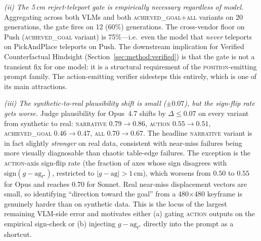 \documentclass{article}
\begin{document}
\emph{(ii) The 5\,cm reject-teleport gate is empirically necessary
regardless of model.} Aggregating across both VLMs and both
\textsc{achieved\_goal}+\textsc{all} variants on 20 generations, the gate
fires on 12 (60\%) generations. The cross-vendor floor on Push
(\textsc{achieved\_goal} variant) is 75\%---i.e.\ even the model that
\emph{never} teleports on PickAndPlace teleports on Push. The downstream
implication for Verified Counterfactual Hindsight
(Section~\ref{sec:method:verified}) is that the gate is not a transient
fix for one model: it is a structural requirement of the
\textsc{position}-emitting prompt family. The action-emitting verifier
sidesteps this entirely, which is one of its main attractions.

\emph{(iii) The synthetic-to-real plausibility shift is small ($\pm 0.07$),
but the sign-flip rate gets worse.} Judge plausibility for Opus~4.7
shifts by $\Delta\!\le\!0.07$ on every variant from synthetic to real:
\textsc{narrative} $0.79\!\to\!0.86$, \textsc{action} $0.55\!\to\!0.51$,
\textsc{achieved\_goal} $0.46\!\to\!0.47$, \textsc{all} $0.70\!\to\!0.67$.
The headline \textsc{narrative} variant is in fact slightly \emph{stronger}
on real data, consistent with near-miss failures being more visually
diagnosable than chaotic table-edge failures. The exception is the
\textsc{action}-axis sign-flip rate (the fraction of axes whose sign disagrees
with $\mathrm{sign}(g\!-\!\mathrm{ag}_{t^\star})$, restricted to
$|g\!-\!\mathrm{ag}|>1$\,cm), which worsens from $0.50$ to $0.55$ for Opus
and reaches $0.70$ for Sonnet. Real near-miss displacement vectors are
small, so identifying ``direction toward the goal'' from a 480$\times$480
keyframe is genuinely harder than on synthetic data. This is the locus
of the largest remaining VLM-side error and motivates either (a) gating
\textsc{action} outputs on the empirical sign-check or (b) injecting
$g\!-\!\mathrm{ag}_{t^\star}$ directly into the prompt as a shortcut.
\end{document}
